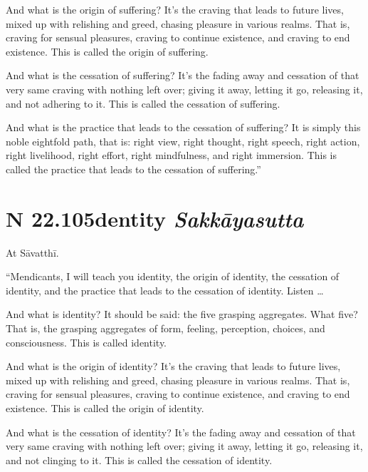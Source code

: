 \documentclass[12pt,openany]{book}%
\newcommand*{\suttatitleacronym}[1]{\smaller[2]{#1}\vspace*{.3em}}
\newcommand*{\suttatitletranslation}[1]{\linebreak{#1}}
\newcommand*{\suttatitleroot}[1]{\linebreak\smaller[2]\itshape{#1}}
\newcommand*{\tocacronym}[1]{\hspace*{-3.3em}{#1}\quad}
\newcommand*{\toctranslation}[1]{#1}
\newcommand*{\tocroot}[1]{(\textit{#1})}
\begin{document}
And what is the origin of suffering? It’s the craving that leads to future lives, mixed up with relishing and greed, chasing pleasure in various realms. That is, craving for sensual pleasures, craving to continue existence, and craving to end existence. This is called the origin of suffering. 

And what is the cessation of suffering? It’s the fading away and cessation of that very same craving with nothing left over; giving it away, letting it go, releasing it, and not adhering to it. This is called the cessation of suffering. 

And what is the practice that leads to the cessation of suffering? It is simply this noble eightfold path, that is: right view, right thought, right speech, right action, right livelihood, right effort, right mindfulness, and right immersion. This is called the practice that leads to the cessation of suffering.” 

%
\section*{{\suttatitleacronym SN 22.105}{\suttatitletranslation Identity }{\suttatitleroot Sakkāyasutta}}
\addcontentsline{toc}{section}{\tocacronym{SN 22.105} \toctranslation{Identity } \tocroot{Sakkāyasutta}}

At \textsanskrit{Sāvatthī}. 

“Mendicants, I will teach you identity, the origin of identity, the cessation of identity, and the practice that leads to the cessation of identity. Listen … 

And what is identity? It should be said: the five grasping aggregates. What five? That is, the grasping aggregates of form, feeling, perception, choices, and consciousness. This is called identity. 

And what is the origin of identity? It’s the craving that leads to future lives, mixed up with relishing and greed, chasing pleasure in various realms. That is, craving for sensual pleasures, craving to continue existence, and craving to end existence. This is called the origin of identity. 

And what is the cessation of identity? It’s the fading away and cessation of that very same craving with nothing left over; giving it away, letting it go, releasing it, and not clinging to it. This is called the cessation of identity. 
\end{document}
